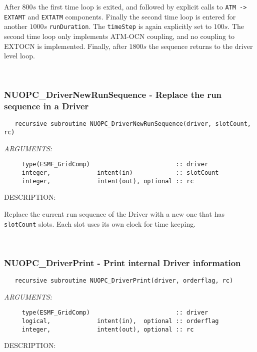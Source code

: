    After $800s$ the first time loop is exited, and followed by explicit calls to
   {\tt ATM -> EXTAMT} and {\tt EXTATM} components. Finally the second time loop
   is entered for another $1000s$ {\tt runDuration}. The {\tt timeStep} is again
   explicitly set to $100s$. The second time loop only implements ATM-OCN
   coupling, and no coupling to EXTOCN is implemented. Finally, after $1800s$
   the sequence returns to the driver level loop. 
 
\mbox{}\hrulefill\ 
 
\subsubsection [NUOPC\_DriverNewRunSequence] {NUOPC\_DriverNewRunSequence - Replace the run sequence in a Driver}


  
\begin{verbatim}   recursive subroutine NUOPC_DriverNewRunSequence(driver, slotCount, rc)\end{verbatim}{\em ARGUMENTS:}
\begin{verbatim}     type(ESMF_GridComp)                        :: driver
     integer,             intent(in)            :: slotCount
     integer,             intent(out), optional :: rc \end{verbatim}
{\sf DESCRIPTION:\\ }


   Replace the current run sequence of the Driver with a new one that has 
   {\tt slotCount} slots. Each slot uses its own clock for time keeping. 
 
\mbox{}\hrulefill\ 
 
\subsubsection [NUOPC\_DriverPrint] {NUOPC\_DriverPrint - Print internal Driver information}


  
\begin{verbatim}   recursive subroutine NUOPC_DriverPrint(driver, orderflag, rc)\end{verbatim}{\em ARGUMENTS:}
\begin{verbatim}     type(ESMF_GridComp)                        :: driver
     logical,             intent(in),  optional :: orderflag
     integer,             intent(out), optional :: rc \end{verbatim}
{\sf DESCRIPTION:\\ }



